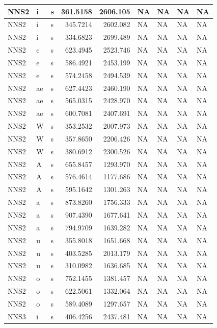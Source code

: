 \documentclass[man, fleqn, noextraspace]{apa6}
\begin{document}
\begin{tabular}{l|l|l|r|r|l|l|l|l}
\hline
NNS2 & i & s & 361.5158 & 2606.105 & NA & NA & NA & NA\\
\hline
NNS2 & i & s & 345.7214 & 2602.082 & NA & NA & NA & NA\\
\hline
NNS2 & i & s & 334.6823 & 2699.489 & NA & NA & NA & NA\\
\hline
NNS2 & e & s & 623.4945 & 2523.746 & NA & NA & NA & NA\\
\hline
NNS2 & e & s & 586.4921 & 2453.199 & NA & NA & NA & NA\\
\hline
NNS2 & e & s & 574.2458 & 2494.539 & NA & NA & NA & NA\\
\hline
NNS2 & ae & s & 627.4423 & 2460.190 & NA & NA & NA & NA\\
\hline
NNS2 & ae & s & 565.0315 & 2428.970 & NA & NA & NA & NA\\
\hline
NNS2 & ae & s & 600.7081 & 2407.691 & NA & NA & NA & NA\\
\hline
NNS2 & W & s & 353.2532 & 2007.973 & NA & NA & NA & NA\\
\hline
NNS2 & W & s & 357.8650 & 2206.426 & NA & NA & NA & NA\\
\hline
NNS2 & W & s & 380.6912 & 2300.526 & NA & NA & NA & NA\\
\hline
NNS2 & A & s & 655.8457 & 1293.970 & NA & NA & NA & NA\\
\hline
NNS2 & A & s & 576.4614 & 1177.686 & NA & NA & NA & NA\\
\hline
NNS2 & A & s & 595.1642 & 1301.263 & NA & NA & NA & NA\\
\hline
NNS2 & a & s & 873.8260 & 1756.333 & NA & NA & NA & NA\\
\hline
NNS2 & a & s & 907.4390 & 1677.641 & NA & NA & NA & NA\\
\hline
NNS2 & a & s & 794.9709 & 1639.282 & NA & NA & NA & NA\\
\hline
NNS2 & u & s & 355.8018 & 1651.668 & NA & NA & NA & NA\\
\hline
NNS2 & u & s & 403.5285 & 2013.179 & NA & NA & NA & NA\\
\hline
NNS2 & u & s & 310.0982 & 1636.685 & NA & NA & NA & NA\\
\hline
NNS2 & o & s & 752.1455 & 1381.457 & NA & NA & NA & NA\\
\hline
NNS2 & o & s & 622.5061 & 1332.064 & NA & NA & NA & NA\\
\hline
NNS2 & o & s & 589.4089 & 1297.657 & NA & NA & NA & NA\\
\hline
NNS3 & i & s & 406.4256 & 2437.481 & NA & NA & NA & NA\\

\end{tabular}
\end{document}
